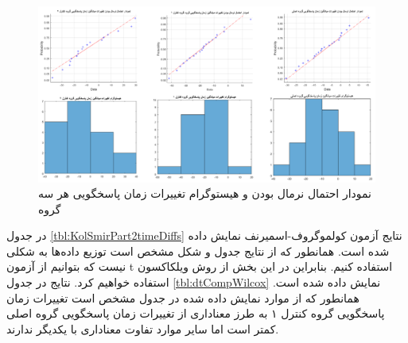 \documentclass[twoside, a4paper,11pt]{book}
\numberwithin{equation}{chapter}
\numberwithin{table}{chapter}
\numberwithin{figure}{chapter}
\numberwithin{equation}{chapter}
\begin{document}
\begin{figure}
\centering
\includegraphics[scale=0.5]{Figures/dtNorm.png}
\caption{\label{fig:dtNorm}
نمودار احتمال نرمال بودن و هیستوگرام تغییرات زمان پاسخگویی هر سه گروه
}
\end{figure}

\begin{table}[]
\end{table}

در جدول \ref{tbl:KolSmirPart2timeDiffs} نتایج آزمون کولموگروف-اسمیرنف نمایش داده شده است. همانطور که از نتایج جدول و شکل مشخص است توزیع داده‌ها به شکلی نیست که بتوانیم از آزمون t استفاده کنیم. بنابراین در این بخش از روش ویلکاکسون استفاده خواهیم کرد. نتایج در جدول \ref{tbl:dtCompWilcox} نمایش داده شده است. همانطور که از موارد نمایش داده شده در جدول مشخص است تغییرات زمان پاسخگویی گروه کنترل ۱ به طرز معناداری از تغییرات زمان پاسخگویی گروه اصلی کمتر است اما سایر موارد تفاوت معناداری با یکدیگر ندارند.
\end{document}

